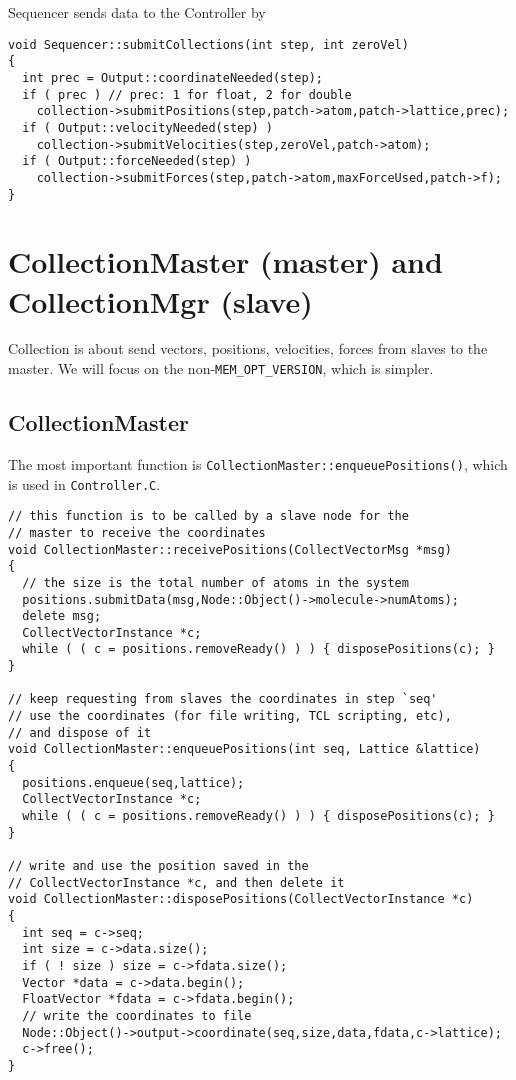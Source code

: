 \documentclass{article}
\begin{document}
Sequencer sends data to the Controller by

\begin{lstlisting}
void Sequencer::submitCollections(int step, int zeroVel)
{
  int prec = Output::coordinateNeeded(step);
  if ( prec ) // prec: 1 for float, 2 for double
    collection->submitPositions(step,patch->atom,patch->lattice,prec);
  if ( Output::velocityNeeded(step) )
    collection->submitVelocities(step,zeroVel,patch->atom);
  if ( Output::forceNeeded(step) )
    collection->submitForces(step,patch->atom,maxForceUsed,patch->f);
}
\end{lstlisting}




\section{\label{sec:collection}CollectionMaster (master) and CollectionMgr (slave)}


Collection is about send vectors, positions, velocities, forces
from slaves to the master.
%
We will focus on the non-\texttt{MEM\_OPT\_VERSION}, which is simpler.

\subsection{CollectionMaster}

The most important function is
\texttt{CollectionMaster::enqueuePositions()},
which is used in \texttt{Controller.C}.

\begin{lstlisting}
// this function is to be called by a slave node for the
// master to receive the coordinates
void CollectionMaster::receivePositions(CollectVectorMsg *msg)
{
  // the size is the total number of atoms in the system
  positions.submitData(msg,Node::Object()->molecule->numAtoms);
  delete msg;
  CollectVectorInstance *c;
  while ( ( c = positions.removeReady() ) ) { disposePositions(c); }
}

// keep requesting from slaves the coordinates in step `seq'
// use the coordinates (for file writing, TCL scripting, etc),
// and dispose of it
void CollectionMaster::enqueuePositions(int seq, Lattice &lattice)
{
  positions.enqueue(seq,lattice);
  CollectVectorInstance *c;
  while ( ( c = positions.removeReady() ) ) { disposePositions(c); }
}

// write and use the position saved in the
// CollectVectorInstance *c, and then delete it
void CollectionMaster::disposePositions(CollectVectorInstance *c)
{
  int seq = c->seq;
  int size = c->data.size();
  if ( ! size ) size = c->fdata.size();
  Vector *data = c->data.begin();
  FloatVector *fdata = c->fdata.begin();
  // write the coordinates to file
  Node::Object()->output->coordinate(seq,size,data,fdata,c->lattice);
  c->free();
}
\end{lstlisting}
\end{document}
